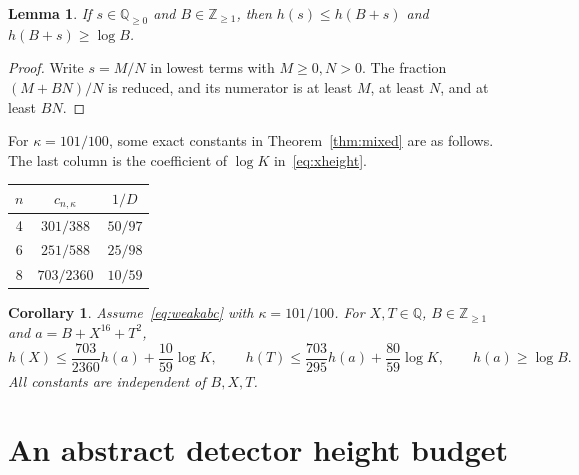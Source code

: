 \documentclass[11pt]{article}
\newcommand{\Q}{\mathbb Q}
\newcommand{\Z}{\mathbb Z}
\newtheorem{lemma}[theorem]{Lemma}
\newtheorem{corollary}[theorem]{Corollary}
\begin{document}
\begin{lemma}\label{lem:shift}
If $s\in\Q_{\ge0}$ and $B\in\Z_{\ge1}$, then
$h(s)\le h(B+s)$ and $h(B+s)\ge\log B$.
\end{lemma}
\begin{proof}
Write $s=M/N$ in lowest terms with $M\ge0,N>0$.
The fraction $(M+BN)/N$ is reduced, and its numerator is at least
$M$, at least $N$, and at least $BN$.
\end{proof}

For $\kappa=101/100$, some exact constants in
Theorem~\ref{thm:mixed} are as follows. The last column is the
coefficient of $\log K$ in~\eqref{eq:xheight}.
\begin{center}
\begin{tabular}{ccc}
\toprule
$n$ & $c_{n,\kappa}$ & $1/D$\\
\midrule
4 & $301/388$ & $50/97$\\
6 & $251/588$ & $25/98$\\
8 & $703/2360$ & $10/59$\\
\bottomrule
\end{tabular}
\end{center}

\begin{corollary}\label{cor:16}
Assume~\eqref{eq:weakabc} with $\kappa=101/100$. For
$X,T\in\Q$, $B\in\Z_{\ge1}$ and $a=B+X^{16}+T^2$,
\[
 h(X)\le\frac{703}{2360}h(a)+\frac{10}{59}\log K,
 \qquad
 h(T)\le\frac{703}{295}h(a)+\frac{80}{59}\log K,
 \qquad h(a)\ge\log B.
\]
All constants are independent of $B,X,T$.
\end{corollary}

\section{An abstract detector height budget}
\end{document}
